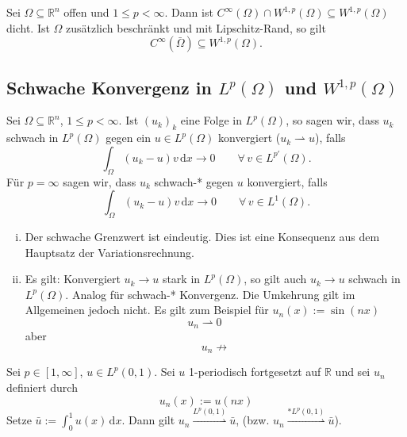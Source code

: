 \begin{satz}
	Sei $\Omega \subseteq \mathbb{R}^n$ offen und $1 \leq p < \infty$. Dann ist $C^{\infty}(\Omega) \cap W^{1,p}(\Omega) \subseteq W^{1,p}(\Omega)$ dicht. Ist 
	$\Omega$ zusätzlich beschränkt und mit Lipschitz-Rand, so gilt 
	\[
		C^{\infty}(\bar{\Omega}) \subseteq W^{1,p}(\Omega).
	\]
\end{satz}
\subsection{Schwache Konvergenz in $L^p(\Omega)$ und $W^{1,p}(\Omega)$} 
\label{sub:schwache_konvergenz_in_l_p_und_w_1_p}

\begin{definition*}
	Sei $\Omega \subseteq \mathbb{R}^n$, $1 \leq p < \infty$. Ist $(u_k)_k$ eine Folge in $L^p(\Omega)$, so sagen wir, dass $u_k$ schwach in $L^p(\Omega)$ gegen ein 
	$u \in L^p(\Omega)$ konvergiert ($u_k \rightharpoonup u$), falls
	\[
		\int_{\Omega}^{}(u_k-u)v \,\mathrm{d}x \to 0 \qquad \forall\, v \in L^{p'}(\Omega).
	\]
	Für $p = \infty$ sagen wir, dass $u_k$ schwach-* gegen $u$ konvergiert, falls
	\[
		\int_{\Omega}^{}(u_k-u)v \,\mathrm{d}x \to 0 \qquad \forall\, v \in L^1(\Omega).
	\]
\end{definition*}
\begin{bemerkung}
	\begin{enumerate}[(i)]
		\item Der schwache Grenzwert ist eindeutig. Dies ist eine Konsequenz aus dem Hauptsatz der Variationsrechnung.
		\item Es gilt: Konvergiert $u_k \to u$ stark in $L^p(\Omega)$, so gilt auch $u_k \to u$ schwach in $L^p(\Omega)$. Analog für schwach-* Konvergenz. Die Umkehrung gilt im Allgemeinen jedoch nicht. Es gilt zum Beispiel für $u_n(x) := \sin(nx)$
		\[
			u_n \rightharpoonup 0 \qquad 
		\]
		aber
		\[
			u_n \not \to
		\]
	\end{enumerate}
\end{bemerkung}
\begin{satz}
	Sei $p \in [1,\infty]$, $u \in L^p(0,1)$. Sei $u$ 1-periodisch fortgesetzt auf $\mathbb{R}$ und sei $u_n$ definiert durch 
	\[
		u_n(x) := u(nx)
	\]
	Setze $\bar{u}:= \int_{0}^{1}u(x) \,\mathrm{d}x$. Dann gilt $u_n \stackrel{L^p(0,1)}{\rightharpoonup} \bar{u}$, (bzw. $u_n \stackrel{* L^p(0,1)}{\rightharpoonup} \bar{u}$).
\end{satz}
